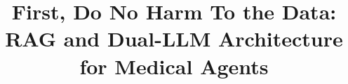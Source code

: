\documentclass[conference, anonymous]{IEEEtran}
\begin{document}
\title{First, Do No Harm To the Data: RAG and Dual-LLM Architecture for Medical Agents
}

\author{
}

\maketitle
\end{document}
